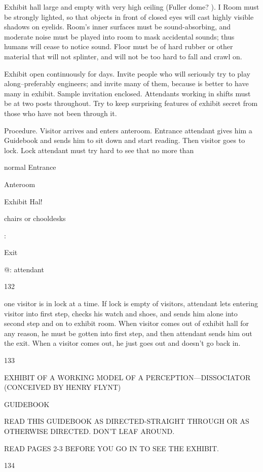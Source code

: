\documentclass[10pt,twoside]{memoir}
\begin{document}
\begin{enumerate}
{\begin{enumerate}
\begin{sysrules}
\begin{sysrules}
\begin{sysrules}
\begin{sysrules}
{\begin{enumerate}
{{{{Exhibit hall large and empty with very high ceiling (Fuller dome? ). I 
Room must be strongly lighted, so that objects in front of closed eyes will 
cast highly visible shadows on eyelids. Room's inner surfaces must be 
sound-absorbing, and moderate noise must be played into room to mask 
accidental sounds; thus humans will cease to notice sound. Floor must be of 
hard rubber or other material that will not splinter, and will not be too hard 
to fall and crawl on. 

Exhibit open continuously for days. Invite people who will seriously 
try to play along--preferably engineers; and invite many of them, because 
is better to have many in exhibit. Sample invitation enclosed. Attendants 
working in shifts must be at two posts throughout. Try to keep surprising 
features of exhibit secret from those who have not been through it. 

Procedure. Visitor arrives and enters anteroom. Entrance attendant 
gives him a Guidebook and sends him to sit down and start reading. Then 
visitor goes to lock. Lock attendant must try hard to see that no more than 


normal 
Entrance 


Anteroom 


Exhibit Hal! 


chairs or 
chooldesks 


: 


Exit 


@: attendant 


132 


one visitor is in lock at a time. If lock is empty of visitors, attendant lets 
entering visitor into first step, checks his watch and shoes, and sends him 
alone into second step and on to exhibit room. When visitor comes out of 
exhibit hall for any reason, he must be gotten into first step, and then 
attendant sends him out the exit. When a visitor comes out, he just goes out 
and doesn't go back in. 


133 


EXHIBIT OF A WORKING MODEL OF A PERCEPTION—DISSOCIATOR 
(CONCEIVED BY HENRY FLYNT) 


GUIDEBOOK 


READ THIS GUIDEBOOK AS DIRECTED-STRAIGHT THROUGH OR AS 
OTHERWISE DIRECTED. DON'T LEAF AROUND. 


READ PAGES 2-3 BEFORE YOU GO IN TO SEE THE EXHIBIT. 


134 


}}}}
\end{enumerate}}
\end{sysrules}
\end{sysrules}
\end{sysrules}
\end{sysrules}
\end{enumerate}}
\end{enumerate}
\end{document}
